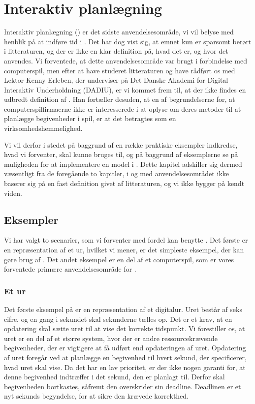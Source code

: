 \chapter{Interaktiv planlægning}
\label{chap:is}
Interaktiv planlægning (\is) er det sidste anvendelsesområde, vi vil belyse med henblik på at indføre tid i \pycsp. Det har dog vist sig, at emnet kun er sparsomt berørt i litteraturen, og der er ikke en klar definition på, hvad det er, og hvor det anvendes. 
Vi forventede, at dette anvendelsesområde var brugt i forbindelse med computerspil, men efter at have studeret litteraturen og have rådført os med Lektor Kenny Erleben, der underviser på Det Danske Akademi for Digital Interaktiv Underholdning (DADIU), er vi kommet frem til, at der ikke findes en udbredt definition af \is. Han fortæller desuden, at en af begrundelserne for, at computerspilfirmaerne ikke er interesserede i at oplyse om deres metoder til at planlægge begivenheder i spil, er at det  betragtes som en  virksomhedshemmelighed. 

Vi vil derfor i stedet på baggrund af en række praktiske eksempler indkredse, hvad vi forventer, \is skal kunne bruges til, og på baggrund af eksemplerne se på muligheden for at implementere en model i \pycsp. Dette kapitel adskiller sig dermed væsentligt fra de foregående to kapitler, i og med anvendelsesområdet ikke baserer sig på en fast definition givet af litteraturen, og vi ikke bygger på kendt viden.

\section{Eksempler}
Vi har valgt to scenarier, som vi forventer med fordel kan benytte \is. Det første er en repræsentation af et ur, hvilket vi mener, er det simpleste eksempel, der kan gøre brug af \is. Det andet eksempel er en del af et computerspil, som er vores forventede primære anvendelsesområde for \is. 

\subsection{Et ur}
Det første eksempel på \is er en repræsentation af et digitalur. Uret består af seks cifre, og en gang i sekundet skal sekunderne tælles op. Det er et  krav, at en opdatering skal sætte uret til at vise det korrekte tidspunkt. Vi forestiller os, at uret er en del af et større system, hvor der er andre ressourcekrævende begivenheder, der er vigtigere at få udført end opdateringen af uret. Opdatering af uret foregår ved at planlægge en begivenhed til hvert sekund, der specificerer, hvad uret skal vise. Da det har en lav prioritet, er der ikke nogen garanti for, at denne begivenhed indtræffer i det sekund, den er planlagt til. Derfor skal begivenheden  bortkastes, såfremt den overskrider sin deadline. Deadlinen er et nyt sekunds begyndelse, for at sikre den krævede korrekthed. 

